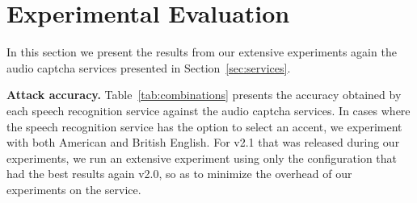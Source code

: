 %
\section{Experimental Evaluation}
\label{sec:evaluation}

In this section we present the results from our extensive experiments again 
the audio captcha services presented in Section~\ref{sec:services}.

\textbf{Attack accuracy.} Table~\ref{tab:combinations} presents the accuracy obtained by each speech recognition service 
against the audio captcha services. In cases where the speech recognition service has the option to select an accent,
we experiment with both American and British English. For \re v2.1 that was released during our experiments, we run
an extensive experiment using only the configuration that had the best results again v2.0, so as to minimize the 
overhead of our experiments on the \re service.

